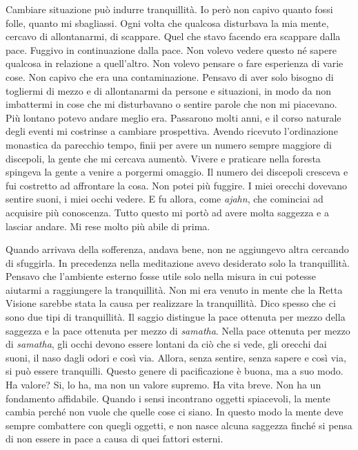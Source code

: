 Cambiare situazione può indurre tranquillità. Io però non capivo quanto
fossi folle, quanto mi sbagliassi. Ogni volta che qualcosa disturbava la
mia mente, cercavo di allontanarmi, di scappare. Quel che stavo facendo
era scappare dalla pace. Fuggivo in continuazione dalla pace. Non volevo
vedere questo né sapere qualcosa in relazione a quell'altro. Non volevo
pensare o fare esperienza di varie cose. Non capivo che era una
contaminazione. Pensavo di aver solo bisogno di togliermi di mezzo e di
allontanarmi da persone e situazioni, in modo da non imbattermi in cose
che mi disturbavano o sentire parole che non mi piacevano. Più lontano
potevo andare meglio era. Passarono molti anni, e il corso naturale
degli eventi mi costrinse a cambiare prospettiva. Avendo ricevuto
l'ordinazione monastica da parecchio tempo, finii per avere un numero
sempre maggiore di discepoli, la gente che mi cercava aumentò. Vivere e
praticare nella foresta spingeva la gente a venire a porgermi omaggio.
Il numero dei discepoli cresceva e fui costretto ad affrontare la cosa.
Non potei più fuggire. I miei orecchi dovevano sentire suoni, i miei
occhi vedere. E fu allora, come \emph{ajahn}, che cominciai ad acquisire
più conoscenza. Tutto questo mi portò ad avere molta saggezza e a
lasciar andare. Mi rese molto più abile di prima.

Quando arrivava della sofferenza, andava bene, non ne aggiungevo altra
cercando di sfuggirla. In precedenza nella meditazione avevo desiderato
solo la tranquillità. Pensavo che l'ambiente esterno fosse utile solo
nella misura in cui potesse aiutarmi a raggiungere la tranquillità. Non
mi era venuto in mente che la Retta Visione sarebbe stata la causa per
realizzare la tranquillità. Dico spesso che ci sono due tipi di
tranquillità. Il saggio distingue la pace ottenuta per mezzo della
saggezza e la pace ottenuta per mezzo di \emph{samatha}. Nella pace
ottenuta per mezzo di \emph{samatha}, gli occhi devono essere lontani da
ciò che si vede, gli orecchi dai suoni, il naso dagli odori e così via.
Allora, senza sentire, senza sapere e così via, si può essere
tranquilli. Questo genere di pacificazione è buona, ma a suo modo. Ha
valore? Si, lo ha, ma non un valore supremo. Ha vita breve. Non ha un
fondamento affidabile. Quando i sensi incontrano oggetti spiacevoli, la
mente cambia perché non vuole che quelle cose ci siano. In questo modo
la mente deve sempre combattere con quegli oggetti, e non nasce alcuna
saggezza finché si pensa di non essere in pace a causa di quei fattori
esterni.

